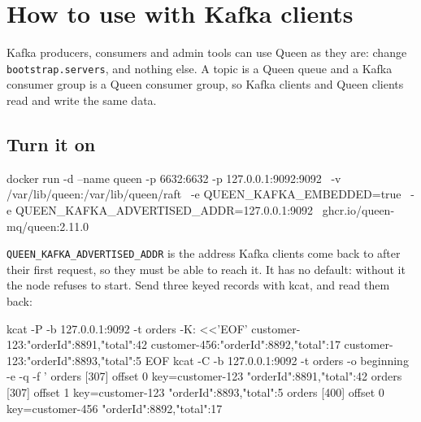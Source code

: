 
\section{How to use with Kafka clients}

Kafka producers, consumers and admin tools can use Queen as they are: change
\texttt{bootstrap.servers}, and nothing else. A topic is a Queen queue and a Kafka consumer group is
a Queen consumer group, so Kafka clients and Queen clients read and write the same data.


\subsection{Turn it on}

\begin{shell}
docker run -d --name queen -p 6632:6632 -p 127.0.0.1:9092:9092 \
  -v /var/lib/queen:/var/lib/queen/raft \
  -e QUEEN_KAFKA_EMBEDDED=true \
  -e QUEEN_KAFKA_ADVERTISED_ADDR=127.0.0.1:9092 \
  ghcr.io/queen-mq/queen:2.11.0
\end{shell}

\texttt{QUEEN\_KAFKA\_ADVERTISED\_ADDR} is the address Kafka clients come back to after their first
request, so they must be able to reach it. It has no default: without it the node refuses to start.
Send three keyed records with kcat, and read them back:

\begin{shell}
kcat -P -b 127.0.0.1:9092 -t orders -K: <<'EOF'
customer-123:{"orderId":8891,"total":42}
customer-456:{"orderId":8892,"total":17}
customer-123:{"orderId":8893,"total":5}
EOF
kcat -C -b 127.0.0.1:9092 -t orders -o beginning -e -q -f '%
orders [307] offset 0  key=customer-123  {"orderId":8891,"total":42}
orders [307] offset 1  key=customer-123  {"orderId":8893,"total":5}
orders [400] offset 0  key=customer-456  {"orderId":8892,"total":17}
\end{shell}

